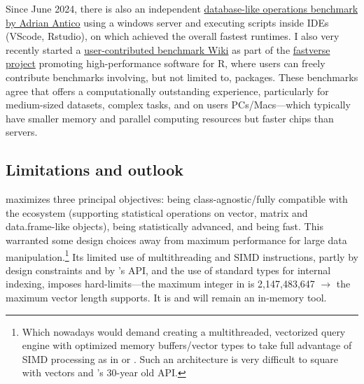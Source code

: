 \documentclass[article]{jss} %
\begin{document}
Since June 2024, there is also an independent \href{https://github.com/AdrianAntico/Benchmarks?tab=readme-ov-file#background}{database-like operations benchmark by Adrian Antico} using a windows server and executing scripts inside IDEs (VScode, Rstudio), on which  achieved the overall fastest runtimes. I also very recently started a \href{https://github.com/fastverse/fastverse/wiki/Benchmarks}{user-contributed benchmark Wiki} as part of the \href{https://fastverse.github.io/fastverse/}{fastverse project} promoting high-performance software for R, where users can freely contribute benchmarks involving, but not limited to,  packages. These benchmarks agree that  offers a computationally outstanding experience, particularly for medium-sized datasets, complex tasks, and on users PCs/Macs---which typically have smaller memory and parallel computing resources but faster chips than servers. %

\subsection{Limitations and outlook}

 maximizes three principal objectives: being class-agnostic/fully compatible with the  ecosystem (supporting statistical operations on vector, matrix and data.frame-like objects), being statistically advanced, and being fast. This warranted some design choices away from maximum performance for large data manipulation.\footnote{Which nowadays would demand creating a multithreaded, vectorized query engine with optimized memory buffers/vector types to take full advantage of SIMD processing as in  or . Such an architecture is very difficult to square with  vectors and 's 30-year old  API.} Its limited use of multithreading and SIMD instructions, partly by design constraints and by 's  API, and the use of standard types for internal indexing, imposes hard-limits---the maximum integer in  is 2,147,483,647 $\to$ the maximum vector length  supports. It is and will remain an in-memory tool. \newline
\end{document}
